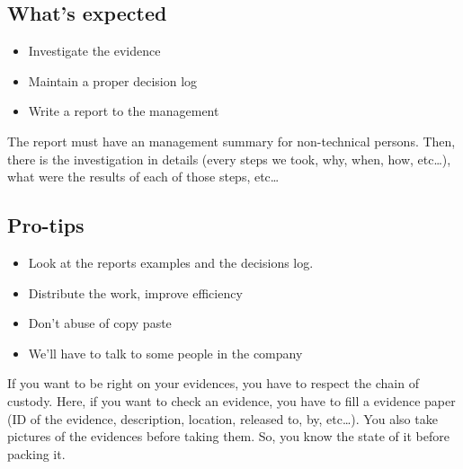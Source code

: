 \subsection{What's expected}
\begin{itemize}
 \item Investigate the evidence
 \item Maintain a proper decision log
 \item Write a report to the management
\end{itemize}
The report must have an management summary for non-technical persons. Then, there is the investigation in details (every steps we took, why, when, how, etc\ldots), what were the results of each of those steps, etc\ldots
\subsection{Pro-tips}
\begin{itemize}
 \item Look at the reports examples and the decisions log.
 \item Distribute the work, improve efficiency
 \item Don't abuse of copy paste
 \item We'll have to talk to some people in the company
\end{itemize}
If you want to be right on your evidences, you have to respect the chain of custody. Here, if you want to check an evidence, you have to fill a evidence paper (ID of the evidence, description, location, released to, by, etc\ldots). You also take pictures of the evidences before taking them. So, you know the state of it before packing it.